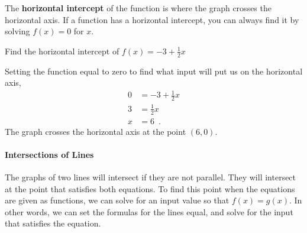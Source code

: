 \begin{definition}
  The \textbf{horizontal intercept} of the function is where the graph crosses the horizontal axis. If a function has a horizontal intercept, you can always find it by solving $f(x) = 0$ for $x$.
\end{definition}

\begin{example}
Find the horizontal intercept of $f(x) = -3 + \frac{1}{2} x$

\begin{solution} Setting the function equal to zero to find what input will put us on the
horizontal axis,
\begin{align*}
  0 &= -3 + \frac{1}{2}x \\
  3 &= \frac{1}{2}x\\
  x &= 6\enspace .
\end{align*}
The graph crosses the horizontal axis at the point $(6,0)$.
\end{solution}\end{example}

\paragraph{Intersections of Lines}

The graphs of two lines will intersect if they are not parallel. They will intersect at the point that satisfies both equations. To find this point when the equations are given as functions, we can solve for an input value so that $f(x)=g(x)$. In other words, we can set the formulas for the lines equal, and solve for the input that satisfies the equation.

